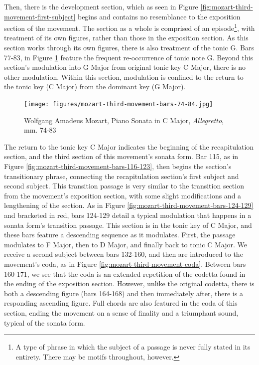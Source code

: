 Then, there is the development section, which as seen in Figure \ref{fig:mozart-third-movement-first-subject}\autocite{Henle_1977} begins and contains no resemblance to the exposition section of the movement. The section as a whole is comprised of an episode\footnote{A type of phrase in which the subject of a passage is never fully stated in its entirety. There may be motifs throughout, however.}, with treatment of its own figures, rather than those in the exposition section. As this section works through its own figures, there is also treatment of the tonic G. Bars 77-83, in Figure \ref{fig:mozart-third-movement-bars-74-84}\autocite{Henle_1977} feature the frequent re-occurrence of tonic note G. Beyond this section's modulation into G Major from original tonic key C Major, there is no other modulation. Within this section, modulation is confined to the return to the tonic key (C Major) from the dominant key (G Major).

\begin{figure}[H]
	\centering
	\texttt{[image: figures/mozart-third-movement-bars-74-84.jpg]}
	\caption{Wolfgang Amadeus Mozart, Piano Sonata in C Major, \textit{Allegretto}, mm. 74-83}
	\label{fig:mozart-third-movement-bars-74-84}
\end{figure}

The return to the tonic key C Major indicates the beginning of the recapitulation section, and the third section of this movement's sonata form. Bar 115, as in Figure \ref{fig:mozart-third-movement-bars-116-123}\autocite{Henle_1977}, then begins the section's transitionary phrase, connecting the recapitulation section's first subject and second subject. This transition passage is very similar to the transition section from the movement's exposition section, with some slight modifications and a lengthening of the section. As in Figure \ref{fig:mozart-third-movement-bars-124-129}\autocite{Henle_1977} and bracketed in red, bars 124-129 detail a typical modulation that happens in a sonata form's transition passage. This section is in the tonic key of C Major, and these bars feature a descending sequence as it modulates. First, the passage modulates to F Major, then to D Major, and finally back to tonic C Major. We receive a second subject between bars 132-160, and then are introduced to the movement's coda, as in Figure \ref{fig:mozart-third-movement-coda}\autocite{Henle_1977}. Between bars 160-171, we see that the coda is an extended repetition of the codetta found in the ending of the exposition section. However, unlike the original codetta, there is both a descending figure (bars 164-168) and then immediately after, there is a responding ascending figure. Full chords are also featured in the coda of this section, ending the movement on a sense of finality and a triumphant sound, typical of the sonata form.

